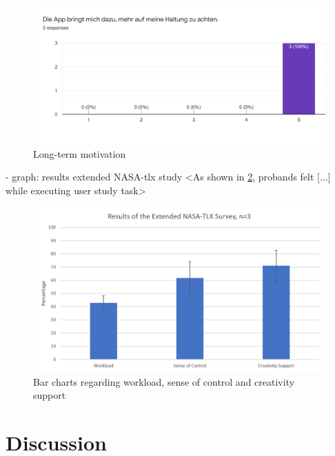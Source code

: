 \begin{figure}[hbp]
\centering
\includegraphics[width=\linewidth]{media/us-gs-longterm-motivation-results.png}    
\caption{Long-term motivation}
\label{fig:us-gs-longterm}
\end{figure}


- graph: results extended NASA-tlx study
<As shown in \ref{fig:ext-nasa-results}, probands felt [...] while executing user study task>

\begin{figure}[hbp]
\centering
\includegraphics[width=\linewidth]{media/us-ext-nasa-tlx-results.png}    
\caption{Bar charts regarding workload, sense of control and creativity support}
    \label{fig:ext-nasa-results}
\end{figure}

\section{Discussion} %
\label{discussion-future-work}


